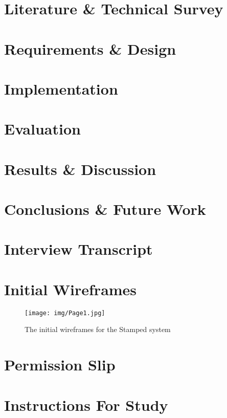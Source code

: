 \documentclass[11pt,openright,a4paper]{report}
\begin{document}
\chapter{Literature \& Technical Survey}


\chapter{Requirements \& Design}



\chapter{Implementation}


\chapter{Evaluation}


\chapter{Results \& Discussion}


\chapter{Conclusions \& Future Work}






\appendix


\chapter{Interview Transcript}

\chapter{Initial Wireframes}
\begin{figure}[H]
 \centering
  \texttt{[image: img/Page1.jpg]}
     \caption{The initial wireframes for the Stamped system}
\end{figure}
\chapter{Permission Slip}

\chapter{Instructions For Study}

\end{document}
